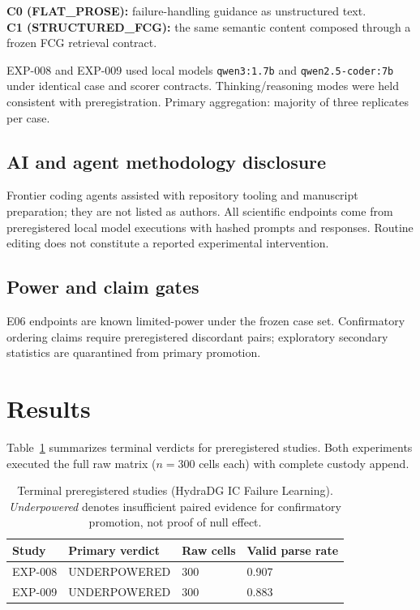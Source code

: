 \documentclass{article}
\begin{document}
\textbf{C0 (FLAT\_PROSE):} failure-handling guidance as unstructured text.\\
\textbf{C1 (STRUCTURED\_FCG):} the same semantic content composed through a frozen FCG retrieval contract.

EXP-008 and EXP-009 used local models \texttt{qwen3:1.7b} and \texttt{qwen2.5-coder:7b} under identical case and scorer contracts.
Thinking/reasoning modes were held consistent with preregistration.
Primary aggregation: majority of three replicates per case.

\subsection{AI and agent methodology disclosure}

Frontier coding agents assisted with repository tooling and manuscript preparation; they are not listed as authors.
All scientific endpoints come from preregistered local model executions with hashed prompts and responses.
Routine editing does not constitute a reported experimental intervention.

\subsection{Power and claim gates}

E06 endpoints are known limited-power under the frozen case set.
Confirmatory ordering claims require preregistered discordant pairs; exploratory secondary statistics are quarantined from primary promotion.

\section{Results}

Table~\ref{tab:terminal} summarizes terminal verdicts for preregistered studies.
Both experiments executed the full raw matrix ($n=300$ cells each) with complete custody append.

\begin{table}[t]
  \centering
  \caption{Terminal preregistered studies (HydraDG IC Failure Learning). \emph{Underpowered} denotes insufficient paired evidence for confirmatory promotion, not proof of null effect.}
  \label{tab:terminal}
  \begin{tabular}{llll}
    \toprule
    Study & Primary verdict & Raw cells & Valid parse rate \\
    \midrule
    EXP-008 & UNDERPOWERED & 300 & 0.907 \\
    EXP-009 & UNDERPOWERED & 300 & 0.883 \\
    \bottomrule
  \end{tabular}
\end{table}
\end{document}
